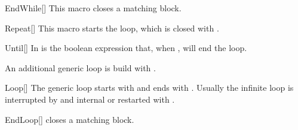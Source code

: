 \documentclass[a4paper, 11pt]{article}
\begin{document}
\begin{macro}{EndWhile}[]
    This macro closes a matching  block.

    \MacroOptionsText
\end{macro}

\begin{tcblisting}{}
    \begin{algorithmic}
        \EndWhile
    \end{algorithmic}
\end{tcblisting}

\begin{macro}{Repeat}[]
    This macro starts the  loop, which is closed with .

    \BlockOptionsText
\end{macro}

\begin{macro}{Until}[]
    In  is the boolean expression that, when , will end the loop.

    \MacroOptionsText
\end{macro}


\begin{tcblisting}{}
    \begin{algorithmic}
        \Repeat
    \end{algorithmic}
\end{tcblisting}


An additional generic loop is build with .

\begin{macro}{Loop}[]
    The generic loop starts with  and ends with . Usually the infinite loop is interrupted by and internal  or restarted with .

    \BlockOptionsText
\end{macro}

\begin{macro}{EndLoop}[]
     closes a matching  block.

    \MacroOptionsText
\end{macro}
\end{document}
